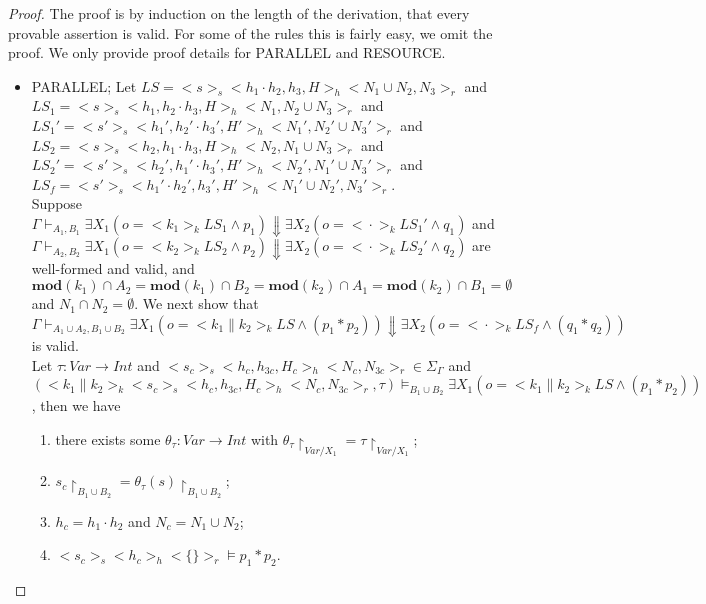 \documentclass{lmcs} %
\theoremstyle{plain}\newtheorem{satz}[thm]{Satz} %
\begin{document}
\begin{proof}
The proof is by induction on the length of the derivation, that every provable assertion is valid. For some of the rules this is fairly easy, we omit the proof. We only provide proof details for PARALLEL and RESOURCE.
\begin{itemize}
  \item PARALLEL; Let $LS=<\!\!s\!\!>_s<\!\!h_1\cdot h_2, h_3,H\!\!>_h<\!\!N_1\cup N_2, N_3\!\!>_r$ and $LS_1=<\!\!s\!\!>_s<\!\!h_1,h_2\cdot h_3,H\!\!>_h<\!\!N_1,N_2\cup N_3\!\!>_r$ and $LS_1'=<\!\!s'\!\!>_s<\!\!h_1',h_2'\cdot h_3',H'\!\!>_h<\!\!N_1',N_2'\cup N_3'\!\!>_r$ and $LS_2=<\!\!s\!\!>_s<\!\!h_2,h_1\cdot h_3,H\!\!>_h<\!\!N_2,N_1\cup N_3\!\!>_r$ and $LS_2'=<\!\!s'\!\!>_s<\!\!h_2',h_1'\cdot h_3',H'\!\!>_h<\!\!N_2',N_1'\cup N_3'\!\!>_r$ and
      $LS_f=<\!\!s'\!\!>_s<\!\!h_1'\cdot h_2',h_3',H'\!\!>_h<\!\!N_1'\cup N_2',N_3'\!\!>_r$.\\
      Suppose
      $\Gamma \vdash_{A_1,B_1} \exists X_1(o=<\!\!k_1\!\!>_k LS_1\land p_1)\Downarrow\exists X_2(o=<\!\!\cdot\!\!>_k LS_1'\land q_1)$ and $\Gamma \vdash_{A_2,B_2} \exists X_1(o=<\!\!k_2\!\!>_k LS_2\land p_2)\Downarrow\exists X_2(o=<\!\!\cdot\!\!>_k LS_2'\land q_2)$ are well-formed and valid, and $\mathbf{mod}(k_1) \cap A_2=\mathbf{mod}(k_1) \cap B_2=\mathbf{mod}(k_2) \cap A_1 =\mathbf{mod}(k_2) \cap B_1 = \emptyset$ and $N_1\cap N_2=\emptyset$. We next show that $\Gamma \vdash_{A_1\cup A_2,B_1\cup B_2} \exists X_1 (o=<\!\!k_1 \parallel k_2\!\!>_k LS\land (p_1*p_2))\Downarrow\exists X_2 (o=<\!\!\cdot\!\!>_k LS_f\land (q_1* q_2))$ is valid.\\
      Let $\tau:\mathit{Var}\to Int$ and $<\!\!s_c\!\!>_s<\!\!h_{c},h_{3c},H_c\!\!>_h<\!\!N_{c},N_{3c}\!\!>_r\in \Sigma_\Gamma$ and $(<\!\!k_1 \parallel k_2\!\!>_k<\!\!s_c\!\!>_s<\!\!h_{c},h_{3c},H_c\!\!>_h<\!\!N_{c},N_{3c}\!\!>_r,\tau)\models_{B_1\cup B_2} \exists X_1 (o=<\!\!k_1 \parallel k_2\!\!>_k LS\land (p_1*p_2))$, then we have
       \begin{enumerate}
         \item there exists some $\theta_\tau:\mathit{Var}\to Int$ with $\theta_\tau\!\!\upharpoonright_{\mathit{Var}/X_1}=\tau\!\!\upharpoonright_{\mathit{Var}/X_1}$;
         \item $s_c\upharpoonright_{B_1\cup B_2}=\theta_\tau(s)\upharpoonright_{B_1\cup B_2}$;
         \item $h_{c}=h_1\cdot h_2$ and $N_{c} = N_1\cup N_2$;
         \item $<\!\!s_c\!\!>_s<\!\!h_{c}\!\!>_h<\!\!\{\}\!\!>_r\models p_1\ast p_2$.

\end{enumerate}
\end{itemize}
\end{proof}
\end{document}
